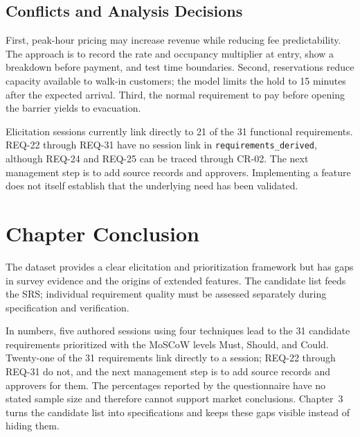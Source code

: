 \subsection{Conflicts and Analysis Decisions}
First, peak-hour pricing may increase revenue while reducing fee predictability. The approach is to record the rate and occupancy multiplier at entry, show a breakdown before payment, and test time boundaries. Second, reservations reduce capacity available to walk-in customers; the model limits the hold to 15 minutes after the expected arrival. Third, the normal requirement to pay before opening the barrier yields to evacuation.

Elicitation sessions currently link directly to 21 of the 31 functional requirements. REQ-22 through REQ-31 have no session link in \texttt{requirements\_derived}, although REQ-24 and REQ-25 can be traced through CR-02. The next management step is to add source records and approvers. Implementing a feature does not itself establish that the underlying need has been validated.

\section{Chapter Conclusion}
The dataset provides a clear elicitation and prioritization framework but has gaps in survey evidence and the origins of extended features. The candidate list feeds the SRS; individual requirement quality must be assessed separately during specification and verification.

In numbers, five authored sessions using four techniques lead to the 31 candidate requirements prioritized with the MoSCoW levels Must, Should, and Could. Twenty-one of the 31 requirements link directly to a session; REQ-22 through REQ-31 do not, and the next management step is to add source records and approvers for them. The percentages reported by the questionnaire have no stated sample size and therefore cannot support market conclusions. Chapter~3 turns the candidate list into specifications and keeps these gaps visible instead of hiding them.
